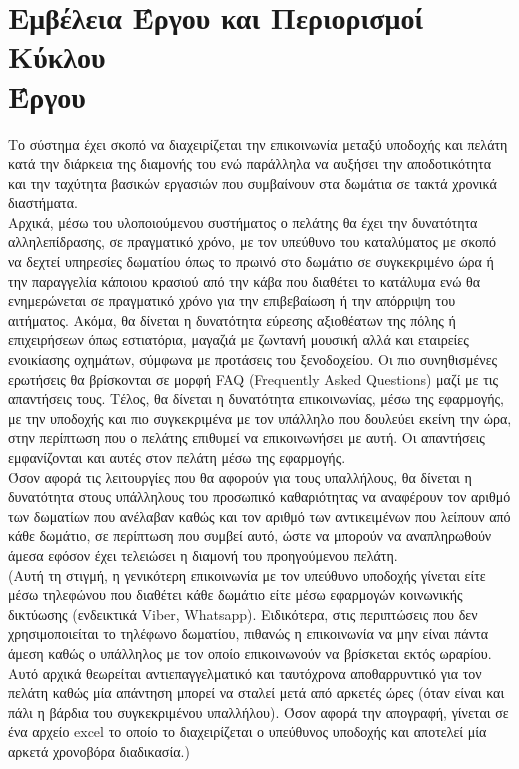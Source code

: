 \section{Εμβέλεια Έργου και Περιορισμοί Κύκλου \\Έργου}		
Το σύστημα έχει σκοπό να διαχειρίζεται την επικοινωνία μεταξύ υποδοχής και πελάτη κατά την διάρκεια της διαμονής του ενώ παράλληλα να αυξήσει την αποδοτικότητα και την ταχύτητα βασικών εργασιών που συμβαίνουν στα δωμάτια σε τακτά χρονικά διαστήματα.\\

\noindent
Αρχικά, μέσω του υλοποιούμενου συστήματος ο πελάτης θα έχει την δυνατότητα αλληλεπίδρασης, σε πραγματικό χρόνο, με τον υπεύθυνο του καταλύματος με σκοπό να δεχτεί υπηρεσίες δωματίου όπως το πρωινό στο δωμάτιο σε συγκεκριμένο ώρα ή την παραγγελία κάποιου κρασιού από την κάβα που διαθέτει το κατάλυμα ενώ θα ενημερώνεται σε πραγματικό χρόνο για την επιβεβαίωση ή την απόρριψη του αιτήματος. Ακόμα, θα δίνεται η δυνατότητα εύρεσης αξιοθέατων της πόλης ή επιχειρήσεων όπως εστιατόρια, μαγαζιά με ζωντανή μουσική αλλά και εταιρείες ενοικίασης οχημάτων, σύμφωνα με προτάσεις του ξενοδοχείου. Οι πιο συνηθισμένες ερωτήσεις θα βρίσκονται σε μορφή FAQ (Frequently Asked Questions) μαζί με τις απαντήσεις τους. Τέλος, θα δίνεται η δυνατότητα επικοινωνίας, μέσω της εφαρμογής, με την υποδοχής και πιο συγκεκριμένα με τον υπάλληλο που δουλεύει εκείνη την ώρα, στην περίπτωση που ο πελάτης επιθυμεί να επικοινωνήσει με αυτή. Οι απαντήσεις εμφανίζονται και αυτές στον πελάτη μέσω της εφαρμογής. \\

\noindent
Όσον αφορά τις λειτουργίες που θα αφορούν για τους υπαλλήλους, θα δίνεται η δυνατότητα στους υπάλληλους του προσωπικό καθαριότητας να αναφέρουν τον αριθμό των δωματίων που ανέλαβαν καθώς και τον αριθμό των αντικειμένων που λείπουν από κάθε δωμάτιο, σε περίπτωση που συμβεί αυτό, ώστε να μπορούν να αναπληρωθούν άμεσα εφόσον έχει τελειώσει η διαμονή του προηγούμενου πελάτη. \\

\noindent
(Αυτή τη στιγμή, η γενικότερη επικοινωνία με τον υπεύθυνο υποδοχής γίνεται είτε μέσω τηλεφώνου που διαθέτει κάθε δωμάτιο είτε μέσω εφαρμογών κοινωνικής δικτύωσης (ενδεικτικά Viber, Whatsapp). Ειδικότερα, στις περιπτώσεις που δεν χρησιμοποιείται το τηλέφωνο δωματίου, πιθανώς η επικοινωνία να μην είναι πάντα άμεση καθώς ο υπάλληλος με τον οποίο επικοινωνούν να βρίσκεται εκτός ωραρίου. Αυτό αρχικά θεωρείται αντιεπαγγελματικό και ταυτόχρονα αποθαρρυντικό για τον πελάτη καθώς μία απάντηση μπορεί να σταλεί μετά από αρκετές ώρες (όταν είναι και πάλι η βάρδια του συγκεκριμένου υπαλλήλου). Όσον αφορά την απογραφή, γίνεται σε ένα αρχείο excel το οποίο το  διαχειρίζεται ο υπεύθυνος υποδοχής και αποτελεί μία αρκετά χρονοβόρα διαδικασία.) \\


